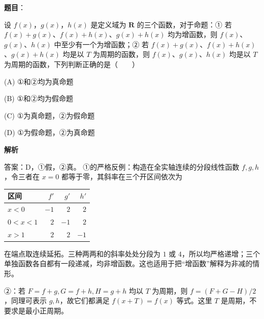 \begin{answer}

\textbf{题目}：

设 \(f(x)\)，\(g(x)\)，\(h(x)\) 是定义域为 \(\mathbf{R}\) 的三个函数，对于命题：① 若 \(f(x)+g(x)\)、\(f(x)+h(x)\)、\(g(x)+h(x)\) 均为增函数，则 \(f(x)\)、\(g(x)\)、\(h(x)\) 中至少有一个为增函数；② 若 \(f(x)+g(x)\)、\(f(x)+h(x)\)、\(g(x)+h(x)\) 均是以 \(T\) 为周期的函数，则 \(f(x)\)、\(g(x)\)、\(h(x)\) 均是以 \(T\) 为周期的函数，下列判断正确的是\mbox{（　　）}

\noindent(A) ①和②均为真命题

\noindent(B) ①和②均为假命题

\noindent(C) ①为真命题，②为假命题

\noindent(D) ①为假命题，②为真命题

\textbf{解析}

答案：D，①假，②真。
①的严格反例：构造在全实轴连续的分段线性函数 \(f,g,h\)，令三者在 \(x=0\) 都等于零，其斜率在三个开区间依次为

\begin{center}
\begin{tabular}{lrrr}
\toprule
区间 & \(f'\) & \(g'\) & \(h'\) \\
\midrule
\(x<0\) & \(-1\) & \(2\) & \(2\) \\
\(0<x<1\) & \(2\) & \(-1\) & \(2\) \\
\(x>1\) & \(2\) & \(2\) & \(-1\) \\
\bottomrule
\end{tabular}
\end{center}

在端点取连续延拓。三种两两和的斜率处处分段为 \(1\) 或 \(4\)，所以均严格递增；三个单独函数各自都有一段递减，均非增函数。这也适用于把“增函数”解释为非减的情形。

②：若 \(F=f+g,G=f+h,H=g+h\) 均以 \(T\) 为周期，则 \(f=(F+G-H)/2\)，同理可表示 \(g,h\)，故它们都满足 \(f(x+T)=f(x)\) 等式。这里 \(T\) 是周期，不要求是最小正周期。


\end{answer}

